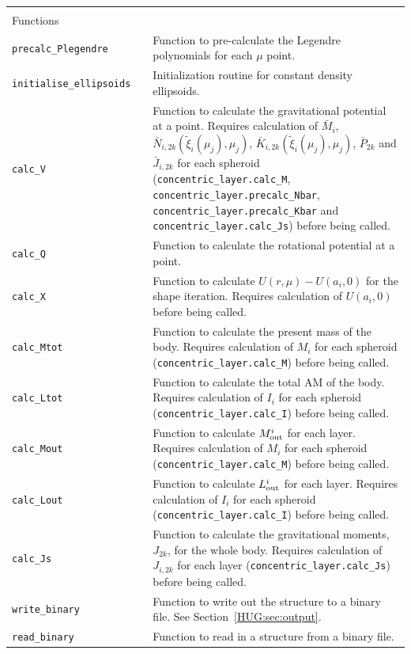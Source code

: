 \documentclass[11pt, oneside]{article}   	%
\begin{document}
\begin{longtable}{l l p{10cm}}
\multicolumn{3}{l}{} \\
\multicolumn{3}{l}{Functions} \\
\hline
\texttt{precalc\_Plegendre} & & Function to pre-calculate the Legendre polynomials for each $\mu$ point. \\
\texttt{initialise\_ellipsoids} & & Initialization routine for constant density ellipsoids. \\
\texttt{calc\_V} & & Function to calculate the gravitational potential at a point. Requires calculation of $\bar{M}_i$, $\bar{N}_{i,2k} (\tilde{\xi}_i (\mu_j), \mu_j)$, $\bar{K}_{i,2k} (\tilde{\xi}_i (\mu_j), \mu_j)$, $\bar{P}_{2k}$ and $\bar{J}_{i,2k}$ for each spheroid (\texttt{concentric\_layer.calc\_M}, \texttt{concentric\_layer.precalc\_Nbar}, \texttt{concentric\_layer.precalc\_Kbar} and \texttt{concentric\_layer.calc\_Js}) before being called. \\
\texttt{calc\_Q} & & Function to calculate the rotational potential at a point. \\
\texttt{calc\_X} & & Function to calculate $U(r, \mu)-U(a_i, 0)$ for the shape iteration. Requires calculation of $U(a_i, 0)$ before being called. \\
\texttt{calc\_Mtot} & & Function to calculate the present mass of the body. Requires calculation of $M_i$ for each spheroid (\texttt{concentric\_layer.calc\_M}) before being called. \\
\texttt{calc\_Ltot} & & Function to calculate the total AM of the body. Requires calculation of $I_i$ for each spheroid (\texttt{concentric\_layer.calc\_I}) before being called. \\
\texttt{calc\_Mout} & & Function to calculate $M_{\rm out}^i$ for each layer. Requires calculation of $M_i$ for each spheroid (\texttt{concentric\_layer.calc\_M}) before being called.  \\
\texttt{calc\_Lout} & & Function to calculate $L_{\rm out}^i$ for each layer. Requires calculation of $I_i$ for each spheroid (\texttt{concentric\_layer.calc\_I}) before being called. \\
\texttt{calc\_Js} & & Function to calculate the gravitational moments, $J_{2k}$, for the whole body. Requires calculation of $J_{i, 2k}$ for each layer (\texttt{concentric\_layer.calc\_Js}) before being called. \\
\texttt{write\_binary} & & Function to write out the structure to a binary file. See Section~\ref{HUG:sec:output}. \\
\texttt{read\_binary} & & Function to read in a structure from a binary file. \\

\end{longtable}
\vspace{0.5 cm}
\end{document}
